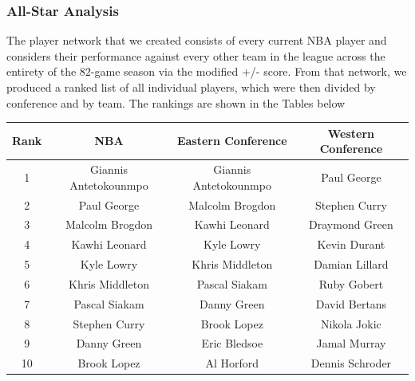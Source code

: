 \documentclass[12pt]{article}%
\begin{document}
\subsubsection{All-Star Analysis}
\label{allstaranalysis}
\null\quad\quad The player network that we created consists of every current NBA player and considers their performance against every other team in the league across the entirety of the $82$-game season via the modified +/- score. From that network, we produced a ranked list of all individual players, which were then divided by conference and by team. The rankings are shown in the Tables below
\begin{center}
\begin{tabular}{|c|c c c|}
\hline
\textbf{Rank} &\textbf{NBA} &\textbf{Eastern Conference}&\textbf{Western Conference}\\\hline
1 & Giannis Antetokounmpo & Giannis Antetokounmpo & Paul George\\\hline
2&Paul George & Malcolm Brogdon & Stephen Curry\\\hline
3&Malcolm Brogdon & Kawhi Leonard & Draymond Green\\\hline
4&Kawhi Leonard&  Kyle Lowry & Kevin Durant\\\hline
5&Kyle Lowry & Khris Middleton & Damian Lillard\\\hline
6&Khris Middleton & Pascal Siakam&Ruby Gobert\\\hline
7&Pascal Siakam & Danny Green&David Bertans\\\hline
8&Stephen Curry & Brook Lopez&Nikola Jokic\\\hline
9&Danny Green & Eric Bledsoe&Jamal Murray\\\hline
10&Brook Lopez & Al Horford&Dennis Schroder\\\hline
\end{tabular}
\end{center}
\end{document}
